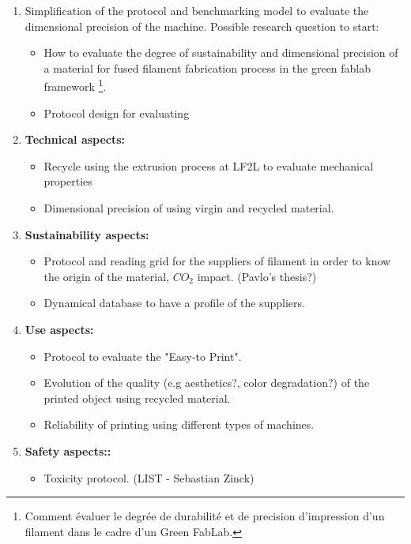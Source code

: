 \begin{enumerate}[noitemsep]
	\item Simplification of the protocol and benchmarking model to evaluate the dimensional precision of the machine. Possible research question to start:
	
	\begin{itemize}
		\item How to evaluate the degree of sustainability and dimensional precision of a material for fused filament fabrication process in the green fablab framework \footnote{Comment évaluer le degrée de durabilité et de precision d’impression d’un filament dans le cadre d’un Green FabLab.}.
		\item Protocol design for evaluating 
	\end{itemize}
	
	\item \textbf{Technical aspects:}
	
		\begin{itemize}
		\item Recycle using the extrusion process at LF2L to evaluate mechanical properties
		\item Dimensional precision of using virgin and recycled material.
	\end{itemize}

	\item \textbf{Sustainability aspects:}

	\begin{itemize}
		\item Protocol and reading grid for the suppliers of filament in order to know the origin of the material, $CO_{2}$ impact. (Pavlo's thesis?)
		\item Dynamical database to have a profile of the suppliers.
	\end{itemize}

	\item \textbf{Use aspects:}

	\begin{itemize}
		\item Protocol to evaluate the "Easy-to Print".
		\item Evolution of the quality (e.g aesthetics?, color degradation?) of the printed object using recycled material.
		\item Reliability of printing using different types of machines.
	\end{itemize}

	\item \textbf{Safety aspects::}

\begin{itemize}
	\item Toxicity protocol. (LIST - Sebastian Zinck)

\end{itemize}

\end{enumerate}

%

